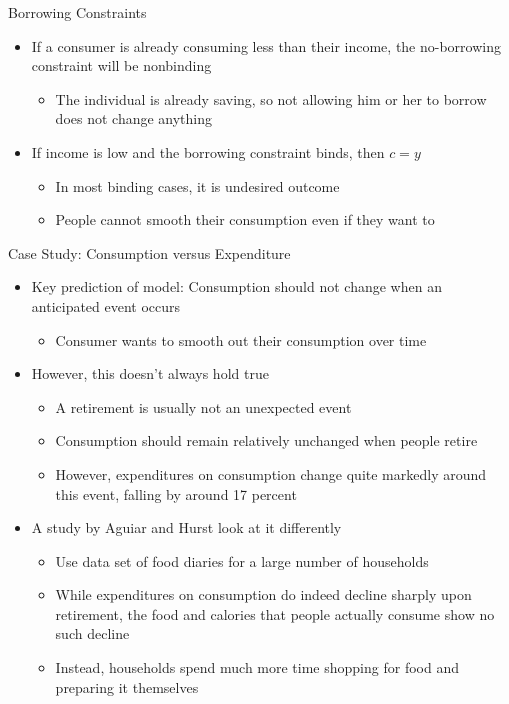 \documentclass[aspectratio=1610]{beamer}
\begin{document}
\begin{frame}[wide]{Borrowing Constraints}
	\begin{itemize}
		\item If a consumer is already consuming less than their income, the no-borrowing constraint will be nonbinding
		\begin{itemize}
			\item The individual is already saving, so not allowing him or her to borrow does not change anything
		\end{itemize}
		\item If income is low and the borrowing constraint binds, then $c=y$
		\begin{itemize}
			\item In most binding cases, it is undesired outcome
			\item People cannot smooth their consumption even if they want to
		\end{itemize}
	\end{itemize}
\end{frame}

\begin{frame}[wide]{Case Study: Consumption versus Expenditure}
	\begin{itemize}
		\item Key prediction of model:	Consumption should not change when an anticipated event occurs
		\begin{itemize}
			\item Consumer wants to smooth out their consumption over time
		\end{itemize}
		\item However, this doesn’t always hold true
		\begin{itemize}
			\item A retirement is usually not an unexpected event
			\item Consumption should remain relatively unchanged when people retire
			\item However, expenditures on consumption change quite markedly around this event, falling by around 17 percent
		\end{itemize}
		\item A study by Aguiar and Hurst look at it differently
		\begin{itemize}
			\item Use data set of food diaries for a large number of households
			\item While expenditures on consumption do indeed decline sharply upon retirement, the food and calories that people actually consume show no such decline
			\item Instead, households spend much more time shopping for food and preparing it themselves
		\end{itemize}
	\end{itemize}
\end{frame}
\end{document}
